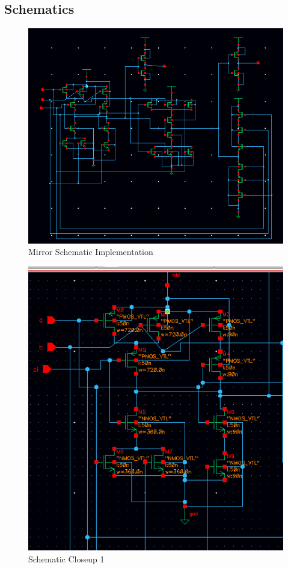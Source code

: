 \documentclass[12pt]{article}
\begin{document}
\subsection{Schematics}
\begin{figure}[H]
\centering
\includegraphics[width=1\linewidth]{mirror-schematic}
\caption{Mirror Schematic Implementation}
\label{fig:mirror-schematic}
\end{figure}

\begin{figure}[H]
\centering
\includegraphics[width=\linewidth]{schematic-closeup-1}
\caption{Schematic Closeup 1}
\label{fig:schematic-closeup-1}
\end{figure}
\end{document}
